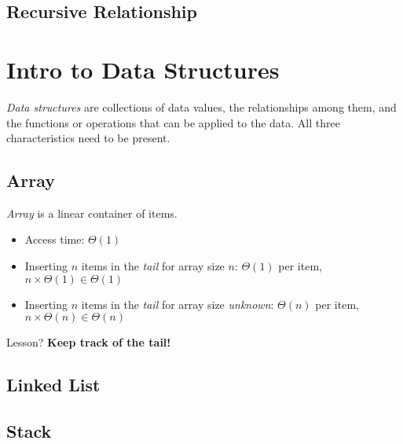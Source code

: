 \documentclass{report}
\begin{document}
\section{Recursive Relationship}


\chapter{Intro to Data Structures}

\textit{Data structures} are collections of data values, the relationships among them, and the functions or operations that can be applied to the data. All three characteristics need to be present.

\section{Array}

\textit{Array} is a linear container of items.

\begin{center}
\end{center}

\begin{itemize}
  \item Access time: $\Theta (1)$
  \item Inserting $n$ items in the \textit{tail} for array size $n$: $\Theta(1)$ per item, $n \times \Theta(1) \in \Theta(1)$
  \item Inserting $n$ items in the \textit{tail} for array size \textit{unknown}: $\Theta(n)$ per item, $n \times \Theta(n) \in \Theta(n)$
\end{itemize}

Lesson? \textbf{Keep track of the tail!}

\section{Linked List}

\section{Stack}
\end{document}

